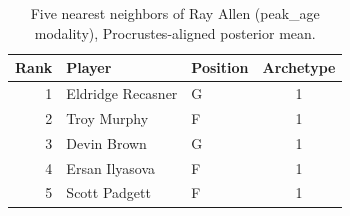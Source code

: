 \begin{table}[htbp]
  \centering\small
  \begin{tabular}{rllc}
    \toprule
    Rank & Player & Position & Archetype \\
    \midrule
    1 & Eldridge Recasner & G & 1 \\
    2 & Troy Murphy & F & 1 \\
    3 & Devin Brown & G & 1 \\
    4 & Ersan Ilyasova & F & 1 \\
    5 & Scott Padgett & F & 1 \\
    \bottomrule
  \end{tabular}
  \caption{Five nearest neighbors of Ray Allen (peak_age modality), Procrustes-aligned posterior mean.}
  \label{tab:Ray_Allen_neighbors_peak_age}
\end{table}

